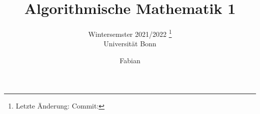 \documentclass[a4paper, 10pt, oneside, openany,  bibliography=totocnumbered]{scrbook}
\begin{document}
\subject{Vorlesungsmitschrift}
\title{Algorithmische Mathematik 1}
\subtitle{
  Wintersemster 2021/2022 \footnote{
    Letzte Änderung: \texttt{\gitAuthorDate}
    \hfill
    Commit: \texttt{\gitAbbrevHash}
  }
  \\
  Universität Bonn
}
\author{Fabian}
\date{}
\publishers{
  Online aufrufbar auf \texttt{\url{https://git-fabus.github.io}.}
  \\
  Veränderungsvorschläge und Verbesserungen bitte an \texttt{\href{mailto:git-fabus@uni-bonn.de}{git-fabus@uni-bonn.de}.}
}

\frontmatter
\maketitle

\tableofcontents

\mainmatter


%
%
%

\appendix %
%

\backmatter
%
\end{document}
